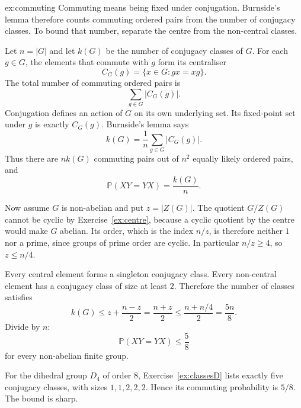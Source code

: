 \begin{solution}{ex:commuting}
\idea Commuting means being fixed under conjugation. Burnside's lemma therefore counts commuting ordered pairs from the number of conjugacy classes. To bound that number, separate the centre from the non-central classes.

\writeup Let $n=|G|$ and let $k(G)$ be the number of conjugacy classes of $G$. For each $g\in G$, the elements that commute with $g$ form its centraliser
\[
C_G(g)=\{x\in G:gx=xg\}.
\]
The total number of commuting ordered pairs is
\[
\sum_{g\in G}|C_G(g)|.
\]
Conjugation defines an action of $G$ on its own underlying set. Its fixed-point set under $g$ is exactly $C_G(g)$. Burnside's lemma says
\[
k(G)=\frac1n\sum_{g\in G}|C_G(g)|.
\]
Thus there are $nk(G)$ commuting pairs out of $n^2$ equally likely ordered pairs, and
\[
\boxed{\mathbb P(XY=YX)=\frac{k(G)}n}.
\]

Now assume $G$ is non-abelian and put $z=|Z(G)|$. The quotient $G/Z(G)$ cannot be cyclic by Exercise~\ref{ex:centre}, because a cyclic quotient by the centre would make $G$ abelian. Its order, which is the index $n/z$, is therefore neither $1$ nor a prime, since groups of prime order are cyclic. In particular $n/z\ge4$, so $z\le n/4$.

Every central element forms a singleton conjugacy class. Every non-central element has a conjugacy class of size at least $2$. Therefore the number of classes satisfies
\[
k(G)\le z+\frac{n-z}2
=\frac{n+z}2
\le\frac{n+n/4}2=\frac{5n}8.
\]
Divide by $n$:
\[
\boxed{\mathbb P(XY=YX)\le\frac58}
\]
for every non-abelian finite group.

For the dihedral group $D_4$ of order $8$, Exercise~\ref{ex:classesD} lists exactly five conjugacy classes, with sizes $1,1,2,2,2$. Hence its commuting probability is $5/8$. The bound is sharp.
\end{solution}


